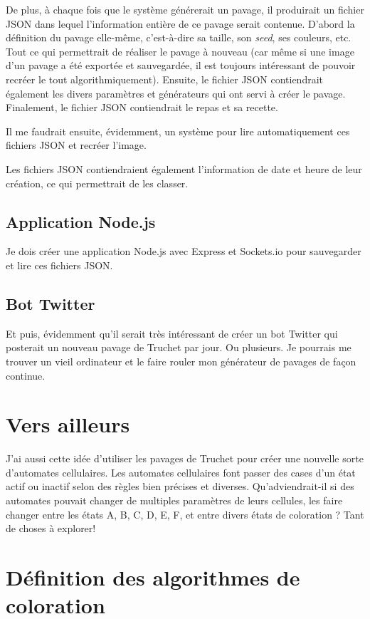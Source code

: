 De plus, à chaque fois que le système générerait un pavage, il produirait un fichier JSON dans lequel l'information entière de ce pavage serait contenue. D'abord la définition du pavage elle-même, c'est-à-dire sa taille, son \textit{seed}, ses couleurs, etc. Tout ce qui permettrait de réaliser le pavage à nouveau (car même si une image d'un pavage a été exportée et sauvegardée, il est toujours intéressant de pouvoir recréer le tout algorithmiquement). Ensuite, le fichier JSON contiendrait également les divers paramètres et générateurs qui ont servi à créer le pavage. Finalement, le fichier JSON contiendrait le repas et sa recette.

Il me faudrait ensuite, évidemment, un système pour lire automatiquement ces fichiers JSON et recréer l'image.

Les fichiers JSON contiendraient également l'information de date et heure de leur création, ce qui permettrait de les classer. 

\subsection{Application Node.js}
Je dois créer une application Node.js avec Express et Sockets.io pour sauvegarder et lire ces fichiers JSON.

\subsection{Bot Twitter}
Et puis, évidemment qu'il serait très intéressant de créer un bot Twitter qui posterait un nouveau pavage de Truchet par jour. Ou plusieurs. Je pourrais me trouver un vieil ordinateur et le faire rouler mon générateur de pavages de façon continue.

\section{Vers ailleurs}
J'ai aussi cette idée d'utiliser les pavages de Truchet pour créer une nouvelle sorte d'automates cellulaires. Les automates cellulaires font passer des cases d'un état actif ou inactif selon des règles bien précises et diverses. Qu'adviendrait-il si des automates pouvait changer de multiples paramètres de leurs cellules, les faire changer entre les états A, B, C, D, E, F, et entre divers états de coloration ? Tant de choses à explorer!

\newpage
\section{Définition des algorithmes de coloration}

